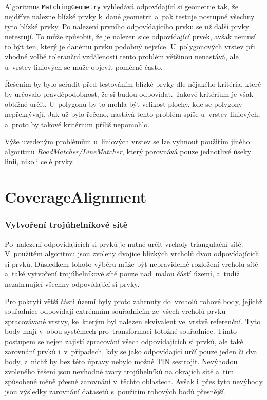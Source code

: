Algoritmus \texttt{MatchingGeometry} vyhledává odpovídající si geometrie tak,
že nejdříve nalezne blízké prvky k~dané geometrii a~pak testuje postupně všechny
tyto blízké prvky. Po nalezení prvního odpovídajícího prvku se už další prvky
netestují. To může způsobit, že je nalezen sice odpovídající prvek, avšak
nemusí to být ten, který je danému prvku podobný nejvíce. U~polygonových vrstev
při vhodné volbě toleranční vzdálenosti tento problém většinou nenastává, 
ale u~vrstev liniových se může objevit poměrně často. 

Řešením by bylo seřadit před testováním blízké prvky dle nějakého
kritéria, které by určovalo pravděpodobnost, že si budou odpovídat. Takové
kritérium je však obtížné určit. U~polygonů by to mohla být velikost plochy,
kde se polygony nepřekrývají. Jak už bylo řečeno, nastává tento problém
spíše u~vrstev liniových, a~proto by takové kritérium příliš nepomohlo.


Výše uvedeným problémům u~liniových vrstev se lze vyhnout použitím jiného
algoritmu \textit{RoadMatcher/LineMatcher}, který porovnává pouze jednotlivé
úseky linií, nikoli celé prvky. 

\section{CoverageAlignment}
\label{problemy-ca}

\subsubsection{Vytvoření trojúhelníkové sítě}
Po~nalezení odpovídajících si prvků je nutné určit vrcholy triangulační sítě.
V~použitém algoritmu jsou zvoleny dvojice blízkých vrcholů dvou odpovídajících
si prvků. Důsledkem tohoto výběru může být nepravidelné rozložení vrcholů sítě
a~také vytvoření troj\-úhelníkové sítě pouze nad~malou částí území, a~tudíž 
nezahrnující všechny odpovídající si prvky.

Pro pokrytí větší části území byly proto zahrnuty do~vrcholů rohové body, jejichž
souřadnice odpovídají extrémním souřadnicím ze~všech vrcholů prvků zpracovávané 
vrstvy, ke~kterým byl nalezen ekvivalent ve~vrstvě referenční. Tyto body mají 
v~obou systémech pro~transformaci totožné souřadnice. Tímto postupem se nejen 
zajistí zpracování všech odpovídajících si prvků, ale také zarovnání prvků 
i~v~případech, kdy se jako odpovídající určí pouze jeden či dva body, z~nichž 
by bez této úpravy nebylo možné TIN sestrojit. Nevýhodou zvoleného řešení jsou 
nevhodné tvary trojúhelníků na okrajích sítě a~tím způsobené méně přesné zarovnání 
v~těchto oblastech. Avšak i~přes tyto nevýhody jsou výsledky zarovnání datasetů 
s~použitím rohových bodů přesnější. 

